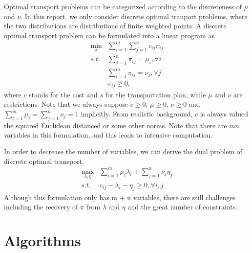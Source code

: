 \documentclass{article}
\begin{document}
\begin{large}
Optimal transport problems can be categorized according to the discreteness of $\mu$ and $\nu$. In this report, we only consider discrete optimal tranport problems, where the two distributions are distributions of finite weighted points.
A discrete optimal transport problem can be formulated into a linear program as
\begin{equation} \label{Eq:StdLP}
\begin{aligned}
\min_{\pi} & \sum_{i=1}^{m}\sum_{j=1}^{n} c_{ i j } \pi_{ i j }\\
s.t. & \sum_{j=1}^{n}\pi_{ i j } = \mu_i, \forall i\\
& \sum_{i=1}^{m}\pi_{ i j } = \nu_j, \forall j \\
& \pi_{ij} \geq 0,
\end{aligned}
\end{equation}
where $c$ stands for the cost and $s$ for the transportation plan, while $\mu$ and $\nu$ are restrictions. Note that we always suppose $ c \geq 0 $, $ \mu \geq 0 $, $ \nu \geq 0 $ and $ \sum_{i=1}^{m}{\mu_i} = \sum_{j=1}^{n}{\nu_j} = 1 $ implicitly. From realistic background, $c$ is always valued the squared Euclidean distanced or some other norms. Note that there are $ m n $ variables in this formulation, and this leads to intensive computation.

In order to decrease the number of variables, we can derive the dual problem of discrete optimal transport.
\begin{equation} \label{Eq:StdLP_dual}
  \begin{aligned}
  \max_{\lambda,\eta} & \sum_{i=1}^{m}\mu_{i}\lambda_{i}+\sum_{j=1}^{n}\nu_{j}\eta_{j}\\
  s.t. & c_{i j}-\lambda_{i}-\eta_{j}\geq0, \forall i, j
  \end{aligned}
\end{equation}
Although this formulation only has m + n variables, there are still challenges including the recovery of $\pi$ from $\lambda$ and $\eta$ and the great number of constraints.
\section{Algorithms}

\end{large}
\end{document}
